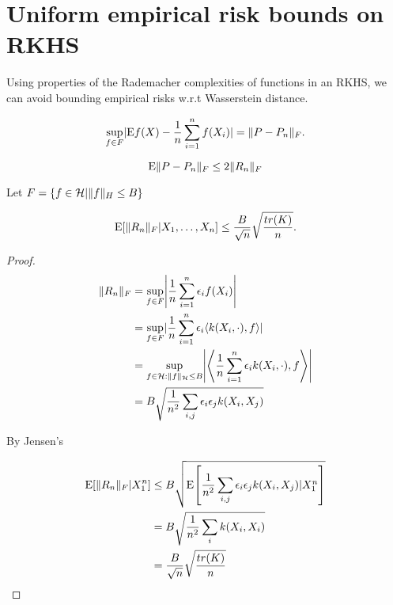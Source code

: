 \section*{Uniform empirical risk bounds on RKHS}
Using properties of the Rademacher complexities of functions in an RKHS, we can avoid bounding empirical risks w.r.t Wasserstein distance.

$$ \sup_{f\in F} \lvert\mathrm{E} f(X) - \frac{1}{n}\sum_{i=1}^n f(X_i)\rvert = \lVert P-P_n\rVert_F. $$

$$ \mathrm{E} \lVert P-P_n\rVert_{F}\leq 2\lVert R_n\rVert_F $$

Let $F = \left\{f\in \mathcal{H} | \lVert f\rVert_{H}\leq B\right\}$

$$ \E \bkt*{\norm{R_n}_{F} | X_1,\ldots,X_n} \leq \frac{B}{\sqrt{n}} \sqrt{\frac{tr(K)}{n}}. $$

\begin{proof}
	\begin{align*}
	\norm{R_n}_F &= \sup_{f\in F} \abs*{ \frac{1}{n} \sum_{i=1}^n \epsilon_i f(X_i)} \\
	&= \sup_{f\in F} \abs{\frac{1}{n} \sum_{i=1}^n \epsilon_i \ang*{k(X_i,\cdot),f}} \\
	&= \sup_{f\in \mathcal{H}:\norm{f}_{\mathcal{H}}\leq B} \abs*{\ang*{\frac{1}{n}\sum_{i=1}^n \epsilon_i k(X_i,\cdot),f}} \\
	&= B\sqrt{\frac{1}{n^2} \sum_{i,j} \epsilon_i \epsilon_j k(X_i,X_j)}
	\end{align*}
	
	By Jensen's
	
	\begin{align*}
	\E \bkt*{ \norm{R_n}_F | X_{1}^{n}} &\leq B\sqrt{\E \bkt*{\frac{1}{n^2} \sum_{i,j} \epsilon_i \epsilon_j k(X_i,X_j)|X_{1}^{n}}} \\
	&= B \sqrt{\frac{1}{n^2} \sum_i k(X_i,X_i)} \\
	&= \frac{B}{\sqrt{n}} \sqrt{\frac{tr(K)}{n}}
	\end{align*}
\end{proof}



